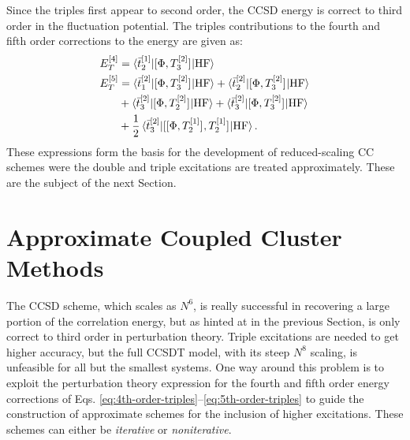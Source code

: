 Since the triples first appear to second order, the \gls{CCSD}
energy is correct to third order in the fluctuation potential.
The triples contributions to the fourth and fifth order corrections to
the energy are given as:
\begin{subequations}
  \begin{align}
    E_T^{[4]} &=
 \braket{\bar{t}_{2}^{[1]}| [ \Phi, T_3^{[2]} ]^{} | \mathrm{HF}}
 \label{eq:4th-order-triples} \\
    E_T^{[5]} &=
    \braket{\bar{t}_{1}^{[2]} | [ \Phi, T_3^{[2]} ]^{} | \mathrm{HF}}
  + \braket{\bar{t}_{2}^{[2]} | [ \Phi, T_3^{[2]} ]^{} | \mathrm{HF}}
  \nonumber \\
  &+ \braket{\bar{t}_{3}^{[2]} | [ \Phi, T_2^{[2]} ]^{} | \mathrm{HF}}
  + \braket{\bar{t}_{3}^{[2]} | [ \Phi, T_3^{[2]} ]^{} | \mathrm{HF}}
  \nonumber \\
    &+
    \frac{1}{2}\braket{\bar{t}_{3}^{[2]} |
    [ [ \Phi, T_2^{[1]} ]^{}, T_2^{[1]} ]^{}
    | \mathrm{HF}}.
 \label{eq:5th-order-triples}
  \end{align}
\end{subequations}
These expressions form the basis for the development of reduced-scaling
\acrshort*{CC} schemes were the double and triple excitations are treated
approximately. These are the subject of the next Section.

\section{Approximate Coupled Cluster Methods}\label{sec:cc-approximate}

The \acrshort*{CCSD} scheme, which scales as $N^6$, is really successful
in recovering a large portion of the correlation energy, but as hinted
at in the previous Section, is only correct to third order in
perturbation theory.
Triple excitations are needed to get higher accuracy, but the full
\gls{CCSDT} model, with its steep $N^8$ scaling, is unfeasible for all
but the smallest systems.
One way around this problem is to exploit the perturbation theory
expression for the fourth and fifth order energy corrections of Eqs.
\eqref{eq:4th-order-triples}--\eqref{eq:5th-order-triples} to guide the
construction of approximate schemes for the inclusion of higher
excitations. These schemes can either be \emph{iterative} or
\emph{noniterative}.

